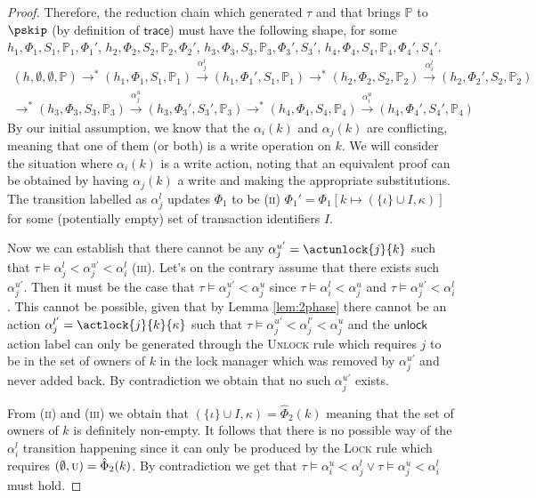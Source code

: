 \begin{proof}
Therefore, the reduction chain which generated $\tau$ and that brings $\mathds{P}$ to $\pskip$ (by definition of $\mathsf{trace}$) must have the following shape, for some $h_1, \Phi_1, S_1, \mathds{P}_1, \Phi_1'$, $h_2, \Phi_2, S_2, \mathds{P}_2, \Phi_2'$, $h_3, \Phi_3, S_3, \mathds{P}_3, \Phi_3', S_3'$, $h_4, \Phi_4, S_4, \mathds{P}_4, \Phi_4', S_4'$.
\begin{gather*}
(h, \emptyset, \emptyset, \mathds{P}) \rightarrow^* (h_1, \Phi_1, S_1, \mathds{P}_1) \xrightarrow{\alpha_j^l} (h_1, \Phi_1', S_1, \mathds{P}_1) \rightarrow^* (h_2, \Phi_2, S_2, \mathds{P}_2) \xrightarrow{\alpha_i^l} (h_2, \Phi_2', S_2, \mathds{P}_2)
\\
\rightarrow^* (h_3, \Phi_3, S_3, \mathds{P}_3) \xrightarrow{\alpha_j^u} (h_3, \Phi_3', S_3', \mathds{P}_3) \rightarrow^* (h_4, \Phi_4, S_4, \mathds{P}_4) \xrightarrow{\alpha_i^u} (h_4, \Phi_4', S_4', \mathds{P}_4)
\end{gather*}
By our initial assumption, we know that the $\alpha_i(k)$ and $\alpha_j(k)$ are conflicting, meaning that one of them (or both) is a write operation on $k$. We will consider the situation where $\alpha_i(k)$ is a write action, noting that an equivalent proof can be obtained by having $\alpha_j(k)$ a write and making the appropriate substitutions. The transition labelled as $\alpha_j^l$ updates $\Phi_1$ to be (\textsc{ii}) $\Phi_1' = \Phi_1[k \mapsto (\{\iota\} \cup I, \kappa)]$ for some (potentially empty) set of transaction identifiers $I$.

Now we can establish that there cannot be any $\alpha_j^{u'} = \actunlock{j}{k}$ such that $\tau \vDash \alpha_j^l < \alpha_j^{u'} < \alpha_i^l$ (\textsc{iii}). Let's on the contrary assume that there exists such $\alpha_j^{u'}$. Then it must be the case that $\tau \vDash \alpha_j^{u'} < \alpha_j^{u}$ since $\tau \vDash \alpha_i^l < \alpha_j^u$ and $\tau \vDash \alpha_j^{u'} < \alpha_i^l$. This cannot be possible, given that by Lemma \ref{lem:2phase} there cannot be an action $\alpha_j^{l'} = \actlock{j}{k}{\kappa}$ such that $\tau \vDash \alpha_j^{u'} < \alpha_j^{l'} < \alpha_j^{u}$ and the $\mathsf{unlock}$ action label can only be generated through the \textsc{Unlock} rule which requires $j$ to be in the set of owners of $k$ in the lock manager which was removed by $\alpha_j^{u'}$ and never added back. By contradiction we obtain that no such $\alpha_j^{u'}$ exists.

From (\textsc{ii}) and (\textsc{iii}) we obtain that $(\{\iota\} \cup I, \kappa) = \hat{\Phi}_2(k)$ meaning that the set of owners of $k$ is definitely non-empty. It follows that there is no possible way of the $\alpha_i^l$ transition happening since it can only be produced by the \textsc{Lock} rule which requires $(\emptyset, \textsc{u}) = \hat{\Phi}_2(k)$. By contradiction we get that $\tau \vDash \alpha_i^u < \alpha_j^l  \lor \tau \vDash \alpha_j^u < \alpha_i^l$ must hold.
\end{proof}